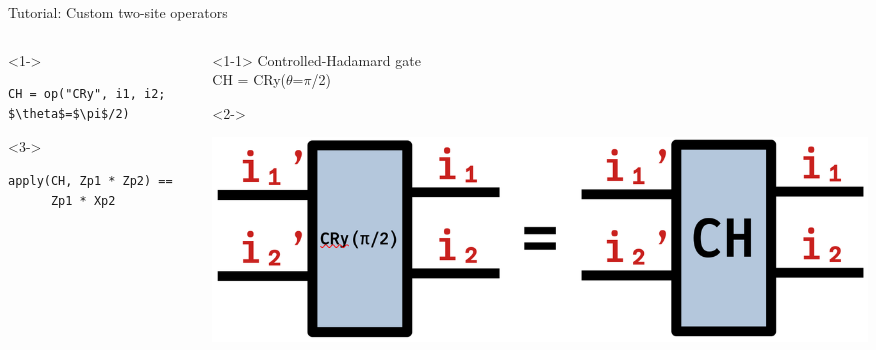 \begin{frame}[fragile]{Tutorial: Custom two-site operators}

\begin{columns}

\begin{column}{5.5cm}

\begin{onlyenv}<1->
\begin{lstlisting}[language=JuliaLocal, style=julia, mathescape, basicstyle=\small]
CH = op("CRy", i1, i2; $\theta$=$\pi$/2)
\end{lstlisting}
\end{onlyenv}

\begin{onlyenv}<3->
~\\
\begin{lstlisting}[language=JuliaLocal, style=julia, mathescape, basicstyle=\small]
apply(CH, Zp1 * Zp2) ==
      Zp1 * Xp2
\end{lstlisting}
\end{onlyenv}

\end{column}

\begin{column}{4.5cm}

\begin{onlyenv}<1-1>
Controlled-Hadamard gate \\
CH = CRy($\theta$=$\pi$/2)
\end{onlyenv}

\begin{onlyenv}<2->
\vspace*{0.0cm}
\begin{center}
\includegraphics[width=1.0\textwidth]{
  slides/assets/CH12.png
}
\end{center}
\vspace*{0.0cm}
\end{onlyenv}



\end{column}
\end{columns}
\end{frame}
